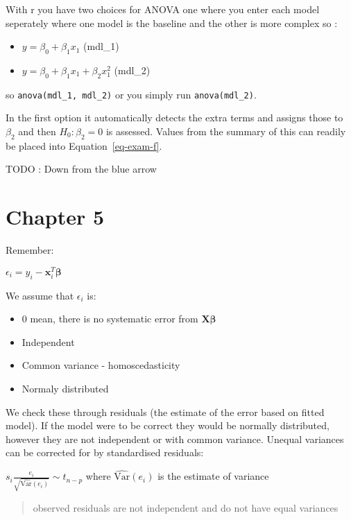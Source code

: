 \documentclass[
  letterpaper,
  DIV=11,
  numbers=noendperiod]{scrreprt}
\providecommand{\tightlist}{%
  \setlength{\itemsep}{0pt}\setlength{\parskip}{0pt}}\usepackage{longtable,booktabs,array}
\begin{document}
With r you have two choices for ANOVA one where you enter each model
seperately where one model is the baseline and the other is more complex
so :

\begin{itemize}
\tightlist
\item
  \(y = \beta_0 + \beta_1x_1\) (mdl\_1)
\item
  \(y = \beta_0 + \beta_1x_1 + \beta_2x_1^2\) (mdl\_2)
\end{itemize}

so \texttt{anova(mdl\_1,\ mdl\_2)} or you simply run
\texttt{anova(mdl\_2)}.

In the first option it automatically detects the extra terms and assigns
those to \(\beta_2\) and then \(H_0: \beta_2 = 0\) is assessed. Values
from the summary of this can readily be placed into
Equation~\ref{eq-exam-f}.

TODO : Down from the blue arrow

\hypertarget{chapter-5}{%
\section{Chapter 5}\label{chapter-5}}

Remember:

\(\epsilon_i = y_i - \textbf{x}_i^T\boldsymbol{\beta}\)

We assume that \(\epsilon_i\) is:

\begin{itemize}
\tightlist
\item
  0 mean, there is no systematic error from
  \(\textbf{X}\boldsymbol{\beta}\)
\item
  Independent
\item
  Common variance - homoscedasticity
\item
  Normaly distributed
\end{itemize}

We check these through residuals (the estimate of the error based on
fitted model). If the model were to be correct they would be normally
distributed, however they are not independent or with common variance.
Unequal variances can be corrected for by standardised residuals:

\(s_i \frac{e_i}{\sqrt{\hat{\text{Var}}(e_i)}} \sim t_{n-p}\) where
\(\hat{\text{Var}}(e_i)\) is the estimate of variance

\begin{quote}
observed residuals are not independent and do not have equal variances
\end{quote}
\end{document}
